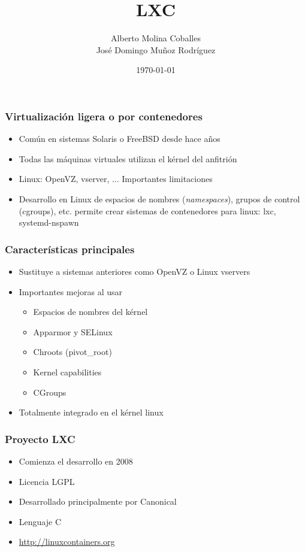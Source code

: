 \documentclass[aspectratio=169]{beamer}
\author{Alberto Molina Coballes\\                                                                                                                            
José Domingo Muñoz Rodríguez}
\title{LXC}
\institute{IES Gonzalo Nazareno}
\date{\today}
\begin{document}
\begin{frame}[t,plain]
\titlepage
\end{frame}

\begin{frame}
  \frametitle{Virtualización ligera o por contenedores}
  \begin{itemize}
  \item Común en sistemas Solaris o FreeBSD desde hace años
  \item Todas las máquinas virtuales utilizan el kérnel del anfitrión
  \item Linux: OpenVZ, vserver, ... Importantes limitaciones
  \item Desarrollo en Linux de espacios de nombres (\textit{namespaces}), grupos de control (cgroups), etc. permite crear sistemas de contenedores para linux: lxc, systemd-nspawn
  \end{itemize}
\end{frame}
\begin{frame}
  \frametitle{Características principales}
  \begin{itemize}
  \item Sustituye a sistemas anteriores como OpenVZ o Linux vservers
  \item Importantes mejoras al usar
    \begin{itemize}
    \item Espacios de nombres del kérnel 
    \item Apparmor y SELinux
    \item Chroots (pivot\_root)
    \item Kernel capabilities
    \item CGroups
    \end{itemize}
  \item Totalmente integrado en el kérnel linux
  \end{itemize}
\end{frame}

\begin{frame}
  \frametitle{Proyecto LXC}
  \begin{itemize}
  \item Comienza el desarrollo en 2008
  \item Licencia LGPL
  \item Desarrollado principalmente por Canonical
  \item Lenguaje C
  \item \url{http://linuxcontainers.org}
  \end{itemize}
\end{frame}
\end{document}
